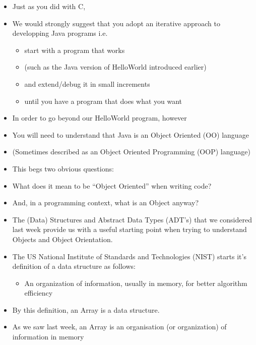 \documentclass{beamer}
\begin{document}
\begin{frame}\begin{itemize}

\item Just as you did with C,

\item We would strongly suggest that you adopt an iterative approach to
developping Java programs i.e.

\begin{itemize}
\item start with a program that works 
\item (such as the Java version of HelloWorld introduced earlier)
\item and extend/debug it in small increments
\item until you have a program that does what you want
\end{itemize}
\end{itemize}\end{frame}\begin{frame}\begin{itemize}


\item In order to go beyond our HelloWorld program, however
\item You will need to understand that Java is an Object Oriented (OO) language
\item (Sometimes described as an Object Oriented Programming (OOP) language)
\bigskip
\bigskip
\item This begs two obvious questions:
\item What does it mean to be ``Object Oriented'' when
writing code?
\item And, in a programming context, what is an
Object anyway?
\end{itemize}
\end{frame}

\begin{frame}
\begin{itemize}
\item The (Data) Structures and Abstract Data Types (ADT's)
that we considered last week provide us with a useful starting point
when trying to understand Objects and Object Orientation.
\end{itemize}
\end{frame}

\begin{frame}
\begin{itemize}
\item The US National Institute of Standards and Technologies (NIST) starts
it's definition of a data structure as follows:

\begin{itemize}
\item An organization of information, usually in memory, for better algorithm
efficiency
\end{itemize}
\item By this definition, an Array is a data structure.
\item As we saw last week, an Array is an organisation (or organization)
of information in memory
\end{itemize}
\end{frame}
\end{document}
